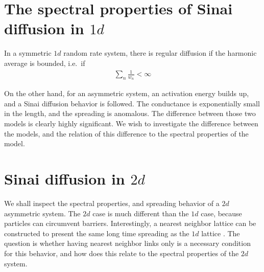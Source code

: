 





\section{The spectral properties of Sinai diffusion in $1d$}

In a symmetric $1d$ random rate system, there is regular diffusion if the harmonic average is bounded, i.e.\ if
%
\begin{align}
 \sum_n \frac{1}{w_n} < \infty 
\end{align}
%

On the other hand, for an asymmetric system, an activation energy builds up, and a Sinai diffusion behavior is followed.
The conductance is exponentially small in the length, and the spreading is anomalous. The difference between those two models is clearly highly significant. We wish to investigate the difference between the models,
and the relation of this difference to the spectral properties of the model.

\section{Sinai diffusion in $2d$}

We shall inspect the spectral properties, and spreading behavior of a $2d$ asymmetric system. The
$2d$ case is much different than the $1d$ case, because particles can circumvent barriers. Interestingly,
a nearest neighbor lattice can be constructed to present the same long time spreading as the $1d$ lattice \cite{blumberg_selinger_diffusion_1989}.
The question is whether having nearest neighbor links only is a necessary condition for this behavior,
and how does this relate to the spectral properties of the $2d$ system.



